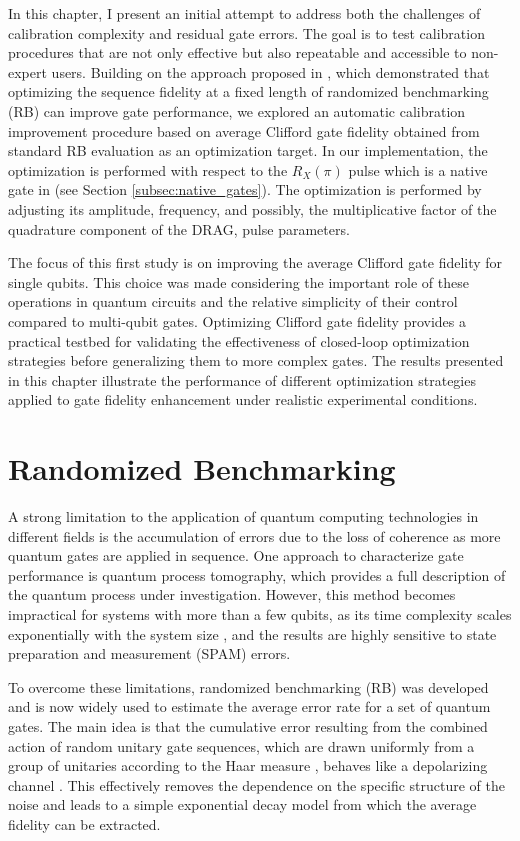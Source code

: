 In this chapter, I present an initial attempt to address both the challenges of calibration complexity and residual gate errors. 
The goal is to test calibration procedures that are not only effective but also repeatable and accessible to non-expert users.  
Building on the approach proposed in \cite{kelly_optimal_2014}, which demonstrated that optimizing the sequence fidelity at a fixed length of randomized benchmarking (RB) can improve gate performance, we explored an automatic calibration improvement procedure based on average Clifford gate fidelity obtained from standard RB evaluation as an optimization target.
In our implementation, the optimization is performed with respect to the $R_X(\pi)$ pulse which is a native gate in \Qibolab (see Section \ref{subsec:native_gates}).
The optimization is performed by adjusting its amplitude, frequency, and possibly, the multiplicative factor of the quadrature component of the DRAG, pulse parameters.

The focus of this first study is on improving the average Clifford gate fidelity for single qubits. 
This choice was made considering the important role of these operations in quantum circuits and the relative simplicity of their control compared to multi-qubit gates.
Optimizing Clifford gate fidelity provides a practical testbed for validating the effectiveness of closed-loop optimization strategies before generalizing them to more complex gates.
The results presented in this chapter illustrate the performance of different optimization strategies applied to gate fidelity enhancement under realistic experimental conditions.

\section{Randomized Benchmarking}\label{sec:RBsection}
A strong limitation to the application of quantum computing technologies in different fields is the accumulation of errors due to the loss of coherence as more quantum gates are applied in sequence. 
One approach to characterize gate performance is quantum process tomography, which provides a full description of the quantum process under investigation. 
However, this method becomes impractical for systems with more than a few qubits, as its time complexity scales exponentially with the system size \cite{QPTomography}, and the results are highly sensitive to state preparation and measurement (SPAM) errors.

To overcome these limitations, randomized benchmarking (RB) was developed and is now widely used to estimate the average error rate for a set of quantum gates. 
The main idea is that the cumulative error resulting from the combined action of random unitary gate sequences, which are drawn uniformly from a group of unitaries according to the Haar measure \cite{Mele_2024}, behaves like a depolarizing channel \cite{Emerson_2005_RB}. 
This effectively removes the dependence on the specific structure of the noise and leads to a simple exponential decay model from which the average fidelity can be extracted.

